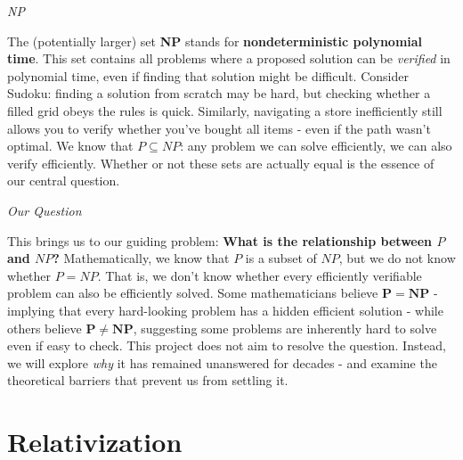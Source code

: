 \documentclass[12pt]{report}
\begin{document}
\begin{center}
    \vspace{0cm}
    {\Large\itshape NP\par}
\end{center}
The (potentially larger) set \textbf{NP} stands for \textbf{nondeterministic polynomial time}. This set contains all problems where a proposed solution can be \textit{verified} in polynomial time, even if finding that solution might be difficult.
Consider Sudoku: finding a solution from scratch may be hard, but checking whether a filled grid obeys the rules is quick. Similarly, navigating a store inefficiently still allows you to verify whether you've bought all items - even if the path wasn't optimal.
We know that $P \subseteq NP$: any problem we can solve efficiently, we can also verify efficiently. Whether or not these sets are actually equal is the essence of our central question.

\begin{center}
    \vspace{0cm}
    {\Large\itshape Our Question\par}
\end{center}
This brings us to our guiding problem: \textbf{What is the relationship between $P$ and $NP$?}
Mathematically, we know that $P$ is a subset of $NP$, but we do not know whether $P = NP$. That is, we don't know whether every efficiently verifiable problem can also be efficiently solved.
Some mathematicians believe $\mathbf{P = NP}$ - implying that every hard-looking problem has a hidden efficient solution - while others believe $\mathbf{P \neq NP}$, suggesting some problems are inherently hard to solve even if easy to check.
This project does not aim to resolve the question. Instead, we will explore \textit{why} it has remained unanswered for decades - and examine the theoretical barriers that prevent us from settling it.

\section*{Relativization}
\end{document}
